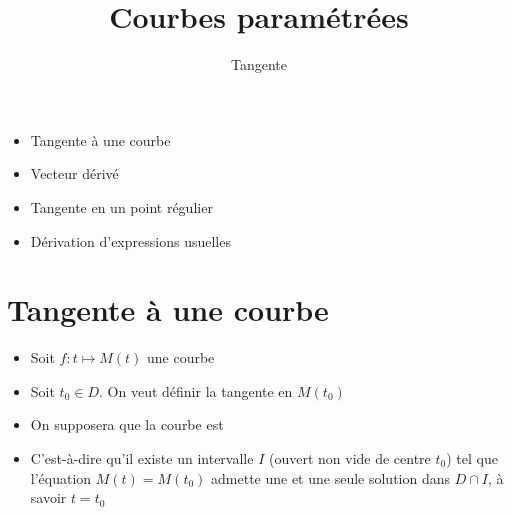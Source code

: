 

   





\title{{\bf Courbes paramétrées}}
\subtitle{Tangente}

\begin{frame}
  
  \debutmontitre

  \pause

{\footnotesize
\hfill
{}
\begin{minipage}{0.6\textwidth}
  \begin{itemize}
    \item<3-> Tangente à une courbe
    \item<4-> Vecteur dérivé
    \item<5-> Tangente en un point régulier
    \item<6-> Dérivation d'expressions usuelles   
  \end{itemize}
\end{minipage}
}

\end{frame}

\setcounter{framenumber}{0}



\section{Tangente à une courbe}



\begin{frame}

\begin{itemize}
  \item Soit $f : t\mapsto M(t)$ une courbe
  \item Soit $t_0\in D$. On veut définir la tangente en $M(t_0)$

  \pause\pause\pause
  \item On supposera que la courbe est 
\pause
  \item C'est-à-dire qu'il existe un intervalle $I$
(ouvert non vide de centre $t_0$) tel que l'équation $M(t)=M(t_0)$ 
admette une et une seule solution dans $D\cap I$, à savoir $t=t_0$
\end{itemize}



\end{frame}



